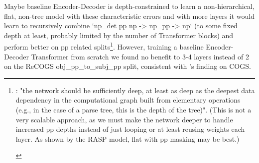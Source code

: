 \documentclass[11pt]{article}
\begin{document}
Maybe \cite{Wu2023} baseline Encoder-Decoder is depth-constrained to learn a non-hierarchical, flat, non-tree model with these characteristic errors and with more layers it would learn to recursively combine `np\_det pp np -> np\_pp -> np` (to some fixed depth at least, probably limited by the number of Transformer blocks) and perform better on pp related splits\footnote{\begin{footnotesize}\cite{Csordas2022}: "the network should be sufficiently deep, at least as deep as the deepest data dependency in the computational graph built from elementary operations (e.g., in the case of a parse tree, this is the depth of the tree)". (This is not a very scalable approach, as we must make the network deeper to handle increased pp depths instead of just looping or at least reusing weights each layer. As shown by the RASP model, flat with pp masking may be best.)\end{footnotesize}}. However, training a \cite{Wu2023} baseline Encoder-Decoder Transformer from scratch we found no benefit to 3-4 layers instead of 2 on the ReCOGS obj\_pp\_to\_subj\_pp split, consistent with \cite{petty2024impactdepthcompositionalgeneralization}'s finding on COGS.
\end{document}
